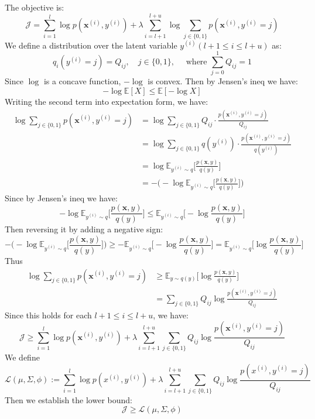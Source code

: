 \documentclass[lang=cn,11pt]{elegantbook}
\begin{document}
The objective is:
$$
\mathcal{J}=\sum_{i=1}^l \log p\left(\mathbf{x}^{(i)}, y^{(i)}\right)+\lambda \sum_{i=l+1}^{l+u} \log \sum_{j \in\{0,1\}} p\left(\mathbf{x}^{(i)}, y^{(i)}=j\right)
$$
We define a distribution over the latent variable $y^{(i)}(l+1 \leq i \leq l+u)$ as:
$$
q_i\left(y^{(i)}=j\right)=Q_{i j}, \quad j \in\{0,1\}, \quad \text { where } \sum_{j=0}^1 Q_{i j}=1
$$
Since $\log$ is a concave function, $-\log$ is convex. Then by Jensen's ineq we have: $$- \log \mathbb{E}[X] \leq \mathbb{E}[-\log X]$$
Writing the second term into expectation form, we have:
\begin{align*}
    \log \sum_{j \in\{0,1\}} p\left(\mathbf{x}^{(i)}, y^{(i)} =j\right)&=\log \sum_{j \in\{0,1\}} Q_{i j} \cdot \frac{p\left(\mathbf{x}^{(i)}, y^{(i)}=j\right)}{Q_{i j}}\\
    & =   \log \sum_{j \in\{0,1\}} {q( y^{(i)})}   \cdot \frac{p\left(\mathbf{x}^{(i)}, y^{(i)}=j\right)}{q( y^{(i)})}           \\
    & = \log \mathbb{E}_{y^{(i)}\sim q} \bigg[\frac{p(\mathbf{x},y)}{q(y)}\bigg ]  \\
    & =    -\bigg(-\log \mathbb{E}_{y^{(i)}\sim q} \bigg[\frac{p(\mathbf{x},y)}{q(y)}\bigg ]     \bigg)   
\end{align*} Since by Jensen's ineq we have: \[
-\log \mathbb{E}_{y^{(i)}\sim q} \bigg[\frac{p(\mathbf{x},y)}{q(y)}\bigg ]     \leq \mathbb{E}_{y^{(i)}\sim q}\bigg[-\log \frac{p(\mathbf{x},y)}{q(y)} \bigg]
\]
Then reversing it by adding a negative sign: \[
 -\bigg(-\log \mathbb{E}_{y^{(i)}\sim q} \bigg[\frac{p(\mathbf{x},y)}{q(y)}\bigg ]     \bigg)      \geq  - \mathbb{E}_{y^{(i)}\sim q} \bigg[-\log \frac{p(\mathbf{x},y)}{q(y)} \bigg]  = \mathbb{E}_{y^{(i)}\sim q} \bigg[\log \frac{p(\mathbf{x},y)}{q(y)} \bigg]
\]
Thus \begin{align*}
        \log \sum_{j \in\{0,1\}} p\left(\mathbf{x}^{(i)}, y^{(i)} =j\right) & \geq  \mathbb{E}_{y\sim q(y)} \bigg[\log\frac{p(\mathbf{x},y)}{q(y)}\bigg ]         \\
    &=  \sum_{j \in\{0,1\}} Q_{i j} \log \frac{p\left(\mathbf{x}^{(i)}, y^{(i)}=j\right)}{Q_{i j}}
\end{align*}
Since this holds for each $l+1 \leq i \leq l+u$, we have:
\[
\mathcal{J} \geq \sum_{i=1}^l \log p\left(\mathbf{x}^{(i)}, y^{(i)}\right)+\lambda \sum_{i=l+1}^{l+u}\sum_{j \in\{0,1\}} Q_{i j} \log \frac{p\left(\mathbf{x}^{(i)}, y^{(i)}=j\right)}{Q_{i j}}
\]
We define \[
\mathcal{L}(\mu, \Sigma, \phi) := \sum_{i=1}^l \log p(x^{(i)}, y^{(i)}) + \lambda \sum_{i=l+1}^{l+u} \sum_{j \in \{0,1\}} Q_{ij} \log \frac{p(x^{(i)}, y^{(i)} = j)}{Q_{ij}} 
\]
Then we establish the lower bound: \[
\mathcal{J} \geq \mathcal{L}(\mu, \Sigma, \phi) 
\]
\end{document}
